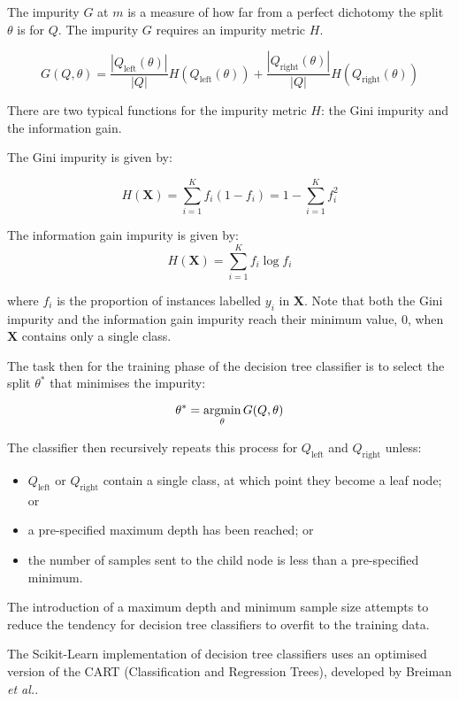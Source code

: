        The impurity $G$ at $m$ is a measure of how far from a perfect dichotomy the split $\theta$ is for $Q$. The impurity $G$ requires an impurity metric $H$.
      
        $$G(Q, \theta) = \frac{|Q_\mathrm{left}(\theta)|}{|Q|} H(Q_\mathrm{left}(\theta)) + \frac{|Q_\mathrm{right}(\theta)|}{|Q|} H(Q_\mathrm{right}(\theta))$$
        
        There are two typical functions for the impurity metric $H$: the Gini impurity and the information gain. 
        
        The Gini impurity is given by:
      
        $$H(\mathbf{X}) = \sum \limits_{i=1}^K f_i(1-f_i) = 1 - \sum \limits_{i=1}^K f_i^2$$
      
        The information gain impurity is given by:
        $$H(\mathbf{X}) = \sum \limits_{i=1}^K f_i \log f_i$$
      
        where $f_i$ is the proportion of instances labelled $y_i$ in $\mathbf{X}$. Note that both the Gini impurity and the information gain impurity reach their minimum value, $0$, when $\mathbf{X}$ contains only a single class.
      
        The task then for the training phase of the decision tree classifier is to select the split $\theta^*$ that minimises the impurity:
      
        $$\theta^* = \operatorname*{argmin}_\theta G(Q, \theta)$$
      
        The classifier then recursively repeats this process for $Q_\mathrm{left}$ and $Q_\mathrm{right}$ unless:
        \begin{itemize}
          \item $Q_\mathrm{left}$ or $Q_\mathrm{right}$ contain a single class, at which point they become a leaf node; or
          \item a pre-specified maximum depth has been reached; or
          \item the number of samples sent to the child node is less than a pre-specified minimum.
        \end{itemize}
      
        The introduction of a maximum depth and minimum sample size attempts to reduce the tendency for decision tree classifiers to overfit to the training data.
      
        The Scikit-Learn implementation of decision tree classifiers uses an optimised version of the CART (Classification and Regression Trees), developed by Breiman \emph{et al.}\cite{breiman1984classification}.
        
